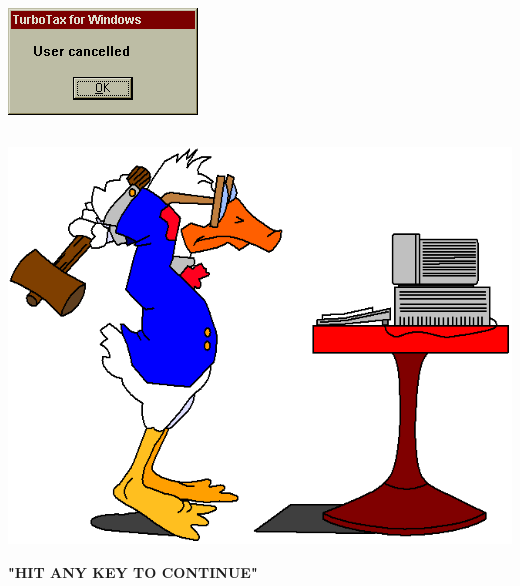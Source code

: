 \documentclass[pdf]{beamer}
\begin{document}
\begin{frame}
\begin{columns}[t]
   	\vspace{-2mm}
    \\
    \vspace{8mm}
    \includegraphics[scale=0.5]{35_turbo.png}
\end{columns}
\end{frame}




\begin{frame}{}

\begin{center}
\includegraphics[scale=0.5]{27_duck.png} 
\end{center}

\begin{center}
{\Large \textbf{"HIT ANY KEY TO CONTINUE"}}
\end{center}

\end{frame}
\end{document}
